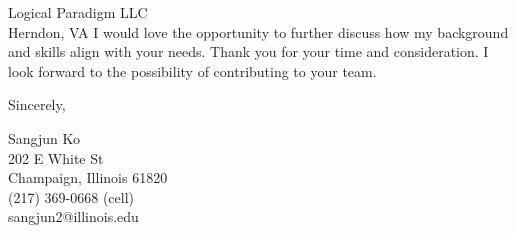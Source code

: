 \documentclass{letter}
\begin{document}
\begin{letter}{Logical Paradigm LLC\\
    Herndon, VA
    }
I would love the opportunity to further discuss how my background and skills align with your needs. Thank you for your time and consideration. I look forward to the possibility of contributing to your team.

\closing{Sincerely,
}

Sangjun Ko\\
202 E White St\\
Champaign, Illinois 61820\\
(217) 369-0668 (cell)\\sangjun2@illinois.edu
\end{letter}
\end{document}
